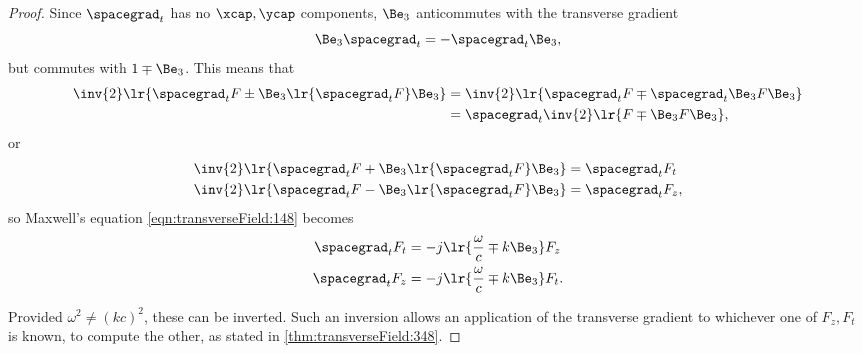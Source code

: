 \begin{proof}
Since \( \spacegrad_t \) has no \( \xcap, \ycap \) components, \( \Be_3 \) anticommutes with the transverse gradient
\begin{equation}\label{eqn:transverseField:168}
\Be_3 \spacegrad_t = - \spacegrad_t \Be_3,
\end{equation}
but commutes with \( 1 \mp \Be_3 \).
This means that
\begin{equation}\label{eqn:transverseField:188}
\begin{aligned}
\inv{2} \lr{ \spacegrad_t F \pm \Be_3 \lr{ \spacegrad_t F } \Be_3 }
&=
\inv{2} \lr{ \spacegrad_t F \mp \spacegrad_t \Be_3 F \Be_3 } \\
&=
\spacegrad_t
\inv{2} \lr{ F \mp \Be_3 F \Be_3 },
\end{aligned}
\end{equation}
or
\begin{equation}\label{eqn:transverseField:208}
\begin{aligned}
\inv{2} \lr{ \spacegrad_t F + \Be_3 \lr{ \spacegrad_t F } \Be_3 } &= \spacegrad_t F_t \\
\inv{2} \lr{ \spacegrad_t F - \Be_3 \lr{ \spacegrad_t F } \Be_3 } &= \spacegrad_t F_z,
\end{aligned}
\end{equation}
so Maxwell's equation \cref{eqn:transverseField:148} becomes
\begin{equation}\label{eqn:transverseField:228}
\begin{aligned}
\spacegrad_t F_t &= - j \lr{ \frac{\omega}{c} \mp k \Be_3 } F_z \\
\spacegrad_t F_z &= - j \lr{ \frac{\omega}{c} \mp k \Be_3 } F_t.
\end{aligned}
\end{equation}

Provided \( \omega^2 \ne (k c)^2 \), these can be inverted.
Such an inversion allows an application of the transverse gradient to whichever one
of \( F_z, F_t \) is known, to compute the other, as stated in
\cref{thm:transverseField:348}.


\end{proof}
